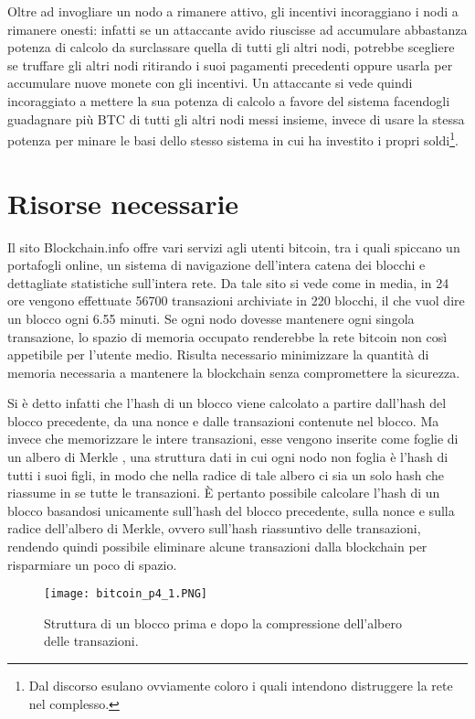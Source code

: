 Oltre ad invogliare un nodo a rimanere attivo, gli incentivi incoraggiano i nodi a rimanere onesti: infatti se un attaccante avido riuscisse ad accumulare abbastanza potenza di calcolo da surclassare quella di tutti gli altri nodi, potrebbe scegliere se truffare gli altri nodi ritirando i suoi pagamenti precedenti oppure usarla per accumulare nuove monete con gli incentivi. Un attaccante si vede quindi incoraggiato a mettere la sua potenza di calcolo a favore del sistema facendogli guadagnare più BTC di tutti gli altri nodi messi insieme, invece di usare la stessa potenza per minare le basi dello stesso sistema in cui ha investito i propri soldi\footnote{Dal discorso esulano ovviamente coloro i quali intendono distruggere la rete nel complesso.}.

\section{Risorse necessarie}\label{risorse-necessarie}

Il sito Blockchain.info \cite{blockchain-info} offre vari servizi agli utenti bitcoin, tra i quali spiccano un portafogli online, un sistema di navigazione dell'intera catena dei blocchi e dettagliate statistiche sull'intera rete. Da tale sito si vede come in media, in 24 ore vengono effettuate 56700 transazioni archiviate in 220 blocchi, il che vuol dire un blocco ogni 6.55 minuti. Se ogni nodo dovesse mantenere ogni singola transazione, lo spazio di memoria occupato renderebbe la rete bitcoin non così appetibile per l'utente medio. Risulta necessario minimizzare la quantità di memoria necessaria a mantenere la blockchain senza compromettere la sicurezza.

Si è detto infatti che l'hash di un blocco viene calcolato a partire dall'hash del blocco precedente, da una nonce e dalle transazioni contenute nel blocco. Ma invece che memorizzare le intere transazioni, esse vengono inserite come foglie di un albero di Merkle \cite{merkle}, una struttura dati in cui ogni nodo non foglia è l'hash di tutti i suoi figli, in modo che nella radice di tale albero ci sia un solo hash che riassume in se tutte le transazioni. È pertanto possibile calcolare l'hash di un blocco basandosi unicamente sull'hash del blocco precedente, sulla nonce e sulla radice dell'albero di Merkle, ovvero sull'hash riassuntivo delle transazioni, rendendo quindi possibile eliminare alcune transazioni dalla blockchain per risparmiare un poco di spazio.

\begin{figure}[htbp]
\centering
\texttt{[image: bitcoin\_p4\_1.PNG]}
\caption[Blocco compresso]{Struttura di un blocco prima e dopo la compressione dell'albero delle transazioni.\label{bitcoin_p4_1}}
\end{figure}

